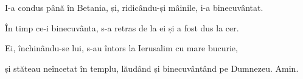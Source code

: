 {


\par }{\PP {}I-a condus până în Betania, și, ridicându-și mâinile, i-a binecuvântat.

În timp ce-i binecuvânta, s-a retras de la ei și a fost dus la cer.

Ei, închinându-se lui, s-au întors la Ierusalim cu mare bucurie,

și stăteau neîncetat în templu, lăudând și binecuvântând pe Dumnezeu. Amin.


\par }